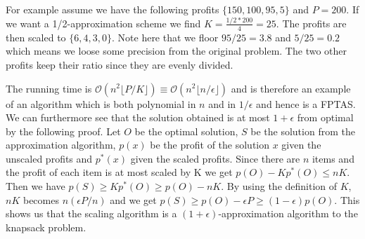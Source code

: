 For example assume we have the following profits $\{ 150, 100, 95, 5 \}$ and $P=200$. If we want a 1/2-approximation scheme we find $K=\frac{1/2*200}{4} = 25$. The profits are then scaled to $\{ 6, 4, 3, 0 \}$. Note here that we floor $95/25=3.8$ and $5/25=0.2$ which means we loose some precision from the original problem. The two other profits keep their ratio since they are evenly divided.

\newpar The running time is $\mathcal{O}(n^2 \lfloor P/K \rfloor) \equiv \mathcal{O}(n^2 \lfloor n/\epsilon \rfloor)$ and is therefore an example of an algorithm which is both polynomial in $n$ and in $1/\epsilon$ and hence is a FPTAS. We can furthermore see that the solution obtained is at most $1+\epsilon$ from optimal by the following proof. Let $O$ be the optimal solution, $S$ be the solution from the approximation algorithm, $p(x)$ be the profit of the solution $x$ given the unscaled profits and $p^*(x)$ given the scaled profits. Since there are $n$ items and the profit of each item is at most scaled by K we get $p(O) - K p^*(O) \le n K$. Then we have $p(S) \ge K p^*(O) \ge p(O)-n K$. By using the definition of $K$, $n K$ becomes $n (\epsilon P/n)$ and we get $p(S) \ge p(O) - \epsilon P \ge (1-\epsilon) p(O)$. This shows us that the scaling algorithm is a $(1+\epsilon)$-approximation algorithm to the knapsack problem.
